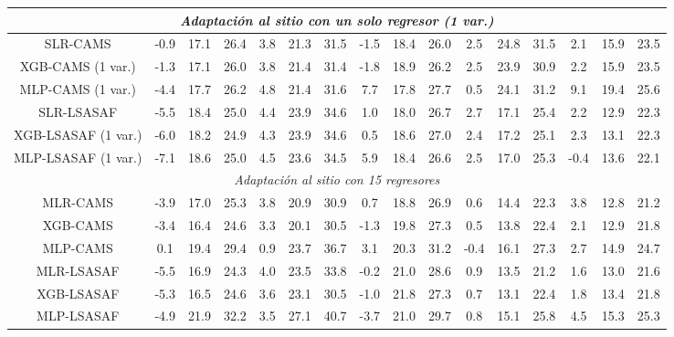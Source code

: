 \begin{table}
{\begin{tabular}{cccccccccccccccc}
\multicolumn{16}{|c|}{\textit{Adaptación al sitio con un solo regresor (1 var.)}} \\
\hline
SLR-CAMS    & -0.9 & 17.1 & 26.4 &  3.8 & 21.3 & 31.5 & -1.5 & 18.4 & 26.0 &  2.5 & 24.8 & 31.5 &  2.1 & 15.9 & 23.5 \\
XGB-CAMS (1 var.) & -1.3 & 17.1 & 26.0 &  3.8 & 21.4 & 31.4 & -1.8 & 18.9 & 26.2 &  2.5 & 23.9 & 30.9 &  2.2 & 15.9 & 23.5 \\
MLP-CAMS (1 var.) & -4.4 & 17.7 & 26.2 &  4.8 & 21.4 & 31.6 &  7.7 & 17.8 & 27.7 &  0.5 & 24.1 & 31.2 &  9.1 & 19.4 & 25.6 \\
SLR-LSASAF  & -5.5 & 18.4 & 25.0 &  4.4 & 23.9 & 34.6 &  1.0 & 18.0 & 26.7 &  2.7 & 17.1 & 25.4 &  2.2 & 12.9 & 22.3 \\
XGB-LSASAF (1 var.) & -6.0 & 18.2 & 24.9 &  4.3 & 23.9 & 34.6 &  0.5 & 18.6 & 27.0 &  2.4 & 17.2 & 25.1 &  2.3 & 13.1 & 22.3 \\
MLP-LSASAF (1 var.) & -7.1 & 18.6 & 25.0 &  4.5 & 23.6 & 34.5 &  5.9 & 18.4 & 26.6 &  2.5 & 17.0 & 25.3 & -0.4 & 13.6 & 22.1 \\
\hline
\multicolumn{16}{|c|}{\textit{Adaptación al sitio con 15 regresores}} \\
\hline
MLR-CAMS    & -3.9 & 17.0 & 25.3 &  3.8 & 20.9 & 30.9 &  0.7 & 18.8 & 26.9 &  0.6 & 14.4 & 22.3 &  3.8 & 12.8 & 21.2 \\
XGB-CAMS    & -3.4 & 16.4 & 24.6 &  3.3 & 20.1 & 30.5 & -1.3 & 19.8 & 27.3 &  0.5 & 13.8 & 22.4 &  2.1 & 12.9 & 21.8 \\
MLP-CAMS    &  0.1 & 19.4 & 29.4 &  0.9 & 23.7 & 36.7 &  3.1 & 20.3 & 31.2 & -0.4 & 16.1 & 27.3 &  2.7 & 14.9 & 24.7 \\
MLR-LSASAF  & -5.5 & 16.9 & 24.3 &  4.0 & 23.5 & 33.8 & -0.2 & 21.0 & 28.6 &  0.9 & 13.5 & 21.2 &  1.6 & 13.0 & 21.6 \\
XGB-LSASAF  & -5.3 & 16.5 & 24.6 &  3.6 & 23.1 & 30.5 & -1.0 & 21.8 & 27.3 &  0.7 & 13.1 & 22.4 &  1.8 & 13.4 & 21.8 \\
MLP-LSASAF  & -4.9 & 21.9 & 32.2 &  3.5 & 27.1 & 40.7 & -3.7 & 21.0 & 29.7 &  0.8 & 15.1 & 25.8 &  4.5 & 15.3 & 25.3 \\
\hline
\end{tabular}}
\end{table}





